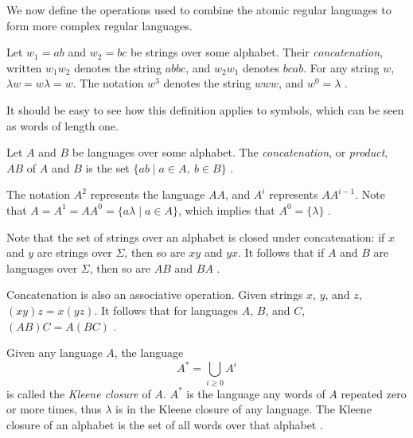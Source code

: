 \documentclass{bcthesis}
\renewcommand{\meo}[1]{}
\newcommand{\footcite}[2]{\xspace\cite[pg.~{#2}]{#1}\xspace}
\begin{document}
	We now define the operations used to combine the atomic regular languages to form more complex regular languages.

	\begin{definition}[Concatenation]
		Let $w_1 = ab$ and $w_2 = bc$ be strings over some alphabet.
		Their \textit{concatenation}, written $w_1 w_2$ denotes the string $abbc$, and $w_2 w_1$ denotes $bcab$.
		For any string $w$, $\lambda w = w \lambda = w$.
		The notation $w^3$ denotes the string $www$, and $w^0 = \lambda$ \footcite{salomaa}{1}.

		It should be easy to see how this definition applies to symbols, which can be seen as words of length one.
	\end{definition}

	\begin{definition}
		Let $A$ and $B$ be languages over some alphabet.
		The \textit{concatenation}, or \textit{product}, $AB$ of $A$ and $B$ is the set $\{ ab \mid a \in A, \ b \in B \}$ \footcite{lemmings}{3}.

		The notation $A^2$ represents the language $AA$, and $A^i$ represents $AA^{i-1}$.
		Note that $A = A^1 = AA^0 = \{ a \lambda \mid a \in A \}$, which implies that $A^0 = \{ \lambda \}$ \footcite{lemmings}{3}.
	\end{definition}

	\begin{remark}
		Note that the set of strings over an alphabet is closed under concatenation: if $x$ and $y$ are strings over $\Sigma$, then so are $xy$ and $yx$.
		It follows that if $A$ and $B$ are languages over $\Sigma$, then so are $AB$ and $BA$ \footcite{lemmings}{2}.
		
		Concatenation is also an associative operation.
		Given strings $x$, $y$, and $z$, $(xy)z = x(yz)$.
		It follows that for languages $A$, $B$, and $C$, ${(AB)C = A(BC)}$ \footcite{lemmings}{2}.

		\meo{
			Maybe also note that length has the properties of the logarithm with regard to concatenation.
			It's a curiosity, but not really useful information
		}

	\end{remark}

	\begin{definition}
		Given any language $A$, the language 
		\[
			A^* = \bigcup_{i \geq 0} A^i
		\]
		is called the \textit{Kleene closure} of $A$.
		$A^*$ is the language any words of $A$ repeated zero or more times, thus $\lambda$ is in the Kleene closure of any language.
		The Kleene closure of an alphabet is the set of all words over that alphabet \footcite{lemmings}{3}.
	\end{definition}
\end{document}
